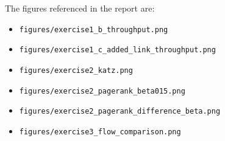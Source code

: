 \documentclass[11pt,a4paper]{article}
\begin{document}
The figures referenced in the report are:
\begin{itemize}
\item \texttt{figures/exercise1\_b\_throughput.png}
\item \texttt{figures/exercise1\_c\_added\_link\_throughput.png}
\item \texttt{figures/exercise2\_katz.png}
\item \texttt{figures/exercise2\_pagerank\_beta015.png}
\item \texttt{figures/exercise2\_pagerank\_difference\_beta.png}
\item \texttt{figures/exercise3\_flow\_comparison.png}
\end{itemize}
\end{document}
